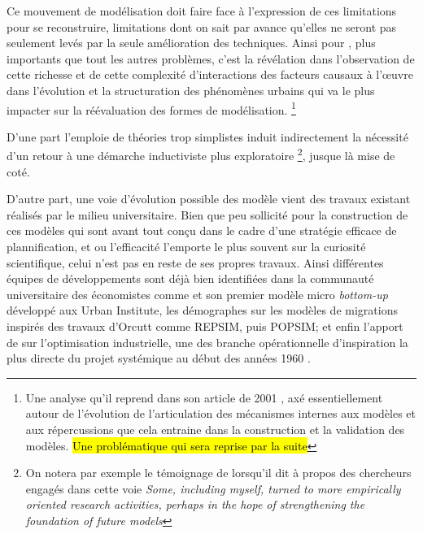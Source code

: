Ce mouvement de modélisation doit faire face à l'expression de ces limitations pour se reconstruire, limitations dont on sait par avance qu'elles ne seront pas seulement levés par la seule amélioration des techniques. Ainsi pour \autocite[11]{Batty1976}, plus importants que tout les autres problèmes, c'est la révélation dans l'observation de cette richesse et de cette complexité d'interactions des facteurs causaux à l’œuvre dans l'évolution et la structuration des phénomènes urbains qui va le plus impacter sur la réévaluation des formes de modélisation. \footnote{Une analyse qu'il reprend dans son article de 2001 \autocite{Batty2001}, axé essentiellement autour de l'évolution de l'articulation des mécanismes internes aux modèles et aux répercussions que cela entraine dans la construction et la validation des modèles. \hl{Une problématique qui sera reprise par la suite}}

D'une part l'emploie de théories trop simplistes induit indirectement la nécessité d'un retour à une démarche inductiviste plus exploratoire \footnote{On notera par exemple le témoignage de \autocite{Boyce1988} lorsqu'il dit à propos des chercheurs engagés dans cette voie \textit{Some, including myself, turned to more empirically oriented research activities, perhaps in the hope of strengthening the foundation of future models}}, jusque là mise de coté. 

D'autre part, une voie d'évolution possible des modèle vient des travaux existant réalisés par le milieu universitaire. Bien que peu sollicité \autocite[9]{Batty1994} pour la construction de ces modèles qui sont avant tout conçu dans le cadre d'une stratégie efficace de plannification, et ou l'efficacité l'emporte le plus souvent sur la curiosité scientifique, celui n'est pas en reste de ses propres travaux. Ainsi différentes équipes de développements sont déjà bien identifiées dans la communauté universitaire des économistes comme \textcite{Orcutt1960} et son premier modèle micro \textit{bottom-up} développé aux Urban Institute, les démographes sur les modèles de migrations inspirés des travaux d'Orcutt comme REPSIM, puis POPSIM; et enfin l'apport de \textcite{Forrester1961} sur l'optimisation industrielle, une des branche opérationnelle d'inspiration la plus directe du projet systémique au début des années 1960 \autocite{Cohen1961} \autocite[911]{Shubik1960b}.

